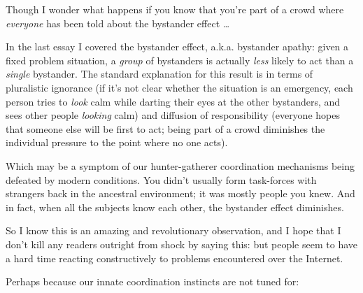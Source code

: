 {
 Though I wonder what happens if you know that
you're part of a crowd where \textit{everyone} has been
told about the bystander effect \ldots}

\myendsectiontext


\bigskip


{
 In the last essay I covered the bystander effect, a.k.a. bystander
apathy: given a fixed problem situation, a \textit{group} of bystanders
is actually \textit{less} likely to act than a \textit{single}
bystander. The standard explanation for this result is in terms of
pluralistic ignorance (if it's not clear whether the
situation is an emergency, each person tries to \textit{look} calm
while darting their eyes at the other bystanders, and sees other people
\textit{looking} calm) and diffusion of responsibility (everyone hopes
that someone else will be first to act; being part of a crowd
diminishes the individual pressure to the point where no one acts). }

{
 Which may be a symptom of our hunter-gatherer coordination
mechanisms being defeated by modern conditions. You
didn't usually form task-forces with strangers back in
the ancestral environment; it was mostly people you knew. And in fact,
when all the subjects know each other, the bystander effect
diminishes.}

{
 So I know this is an amazing and revolutionary observation, and I
hope that I don't kill any readers outright from shock
by saying this: but people seem to have a hard time reacting
constructively to problems encountered over the Internet.}

{
 Perhaps because our innate coordination instincts are not tuned
for:}

